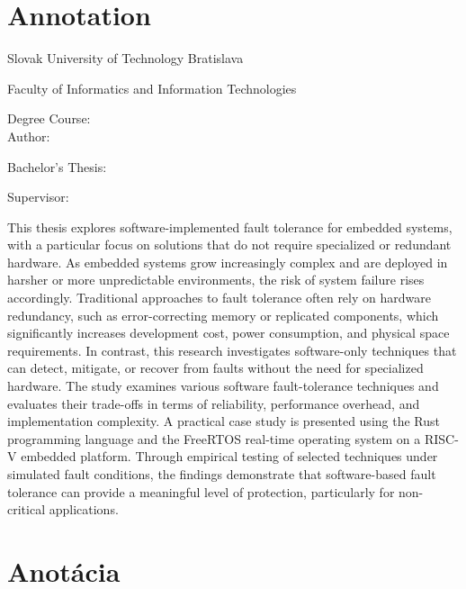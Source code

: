 
\thispagestyle{empty}

\section*{Annotation}

\begin{minipage}[t]{1\columnwidth}%
Slovak University of Technology Bratislava 

Faculty of Informatics and Information Technologies

Degree Course: \myStudyProgram\\

Author: \myName

Bachelor's Thesis: \myTitle

Supervisor: \mySupervisor

\myDate%
\end{minipage}

\bigskip{}

This thesis explores software-implemented fault tolerance for embedded systems, with a particular focus on solutions that do not require specialized or redundant hardware. As embedded systems grow increasingly complex and are deployed in harsher or more unpredictable environments, the risk of system failure rises accordingly. Traditional approaches to fault tolerance often rely on hardware redundancy, such as error-correcting memory or replicated components, which significantly increases development cost, power consumption, and physical space requirements. In contrast, this research investigates software-only techniques that can detect, mitigate, or recover from faults without the need for specialized hardware. The study examines various software fault-tolerance techniques and evaluates their trade-offs in terms of reliability, performance overhead, and implementation complexity. A practical case study is presented using the Rust programming language and the FreeRTOS real-time operating system on a RISC-V embedded platform. Through empirical testing of selected techniques under simulated fault conditions, the findings demonstrate that software-based fault tolerance can provide a meaningful level of protection, particularly for non-critical applications.

\thispagestyle{empty}
\mbox{}
\newpage

\thispagestyle{empty}
\section*{Anotácia}


